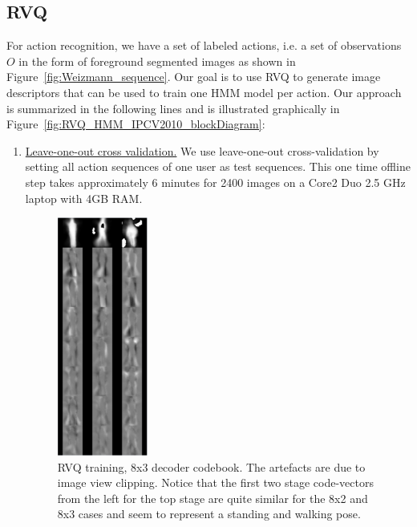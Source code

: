 \subsection{RVQ}
For action recognition, we have a set of labeled actions, i.e. a set of observations $O$ in the form of foreground segmented images as shown in Figure~\ref{fig:Weizmann_sequence}.  Our goal is to use RVQ to generate image descriptors that can be used to train one HMM model per action.  Our approach is summarized in the following lines and is illustrated graphically in Figure~\ref{fig:RVQ_HMM_IPCV2010_blockDiagram}:

\begin{enumerate}
\item \underline{Leave-one-out cross validation.}  We use leave-one-out cross-validation \cite{2000_JNL_SURVEYprml_Jain} by setting all action sequences of one user as test sequences.  This one time offline step takes approximately 6 minutes for 2400 images on a Core2 Duo 2.5 GHz laptop with 4GB RAM.

								\begin{figure}[t]	
								\centering
								\includegraphics[width=0.28\textwidth]{figs/Proposal_fig6a_RVQ_HMM_Weizmann_codebooks_8x3.png}
								\caption{RVQ training, 8x3 decoder codebook.  The artefacts are due to image view clipping.  Notice that the first two stage code-vectors from the left for the top stage are quite similar for the 8x2 and 8x3 cases and seem to represent a standing and walking pose.}
							\label{fig:8x3_codebook}
								\end{figure}


\end{enumerate}
